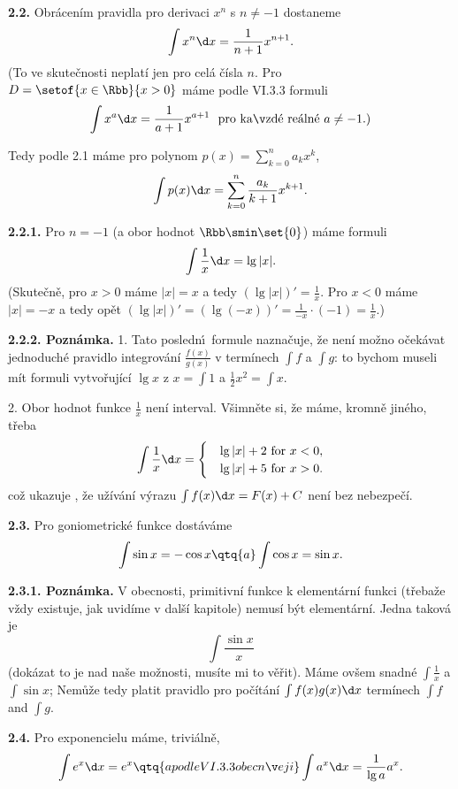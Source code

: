 \documentclass[12pt]{article}
\begin{document}
{  \bigskip
  
  {\bf 2.2.} Obrácením pravidla pro derivaci $x^n$ s $n\neq-1$ dostaneme
  $$
  \int x^n\d x=\frac{1}{n+1}x^{n+1}.
  $$
  (To ve skutečnosti neplatí jen pro celá čísla $n$. Pro $D=\setof{x\in\Rbb}{x>0}$ máme podle VI.3.3 formuli
  $$
  \int x^a\d x=\frac{1}{a+1}x^{a+1} \ \ \text{pro každé reálné $a\neq -1$}. )
  $$
  
  \smallskip
  Tedy podle 2.1 máme pro polynom $p(x)=\sum_{k=0}^na_kx^k$,
  $$
  \int p(x)\d x= \sum_{k=0}^n\frac{a_k}{k+1}x^{k+1}.
  $$
  
  \medskip
  
  {\bf 2.2.1.} Pro $n=-1$ (a obor hodnot $\Rbb\smin\set{0}$) máme formuli
  $$
  \int\frac{1}{x}\d x= \lg |x|.
  $$
 (Skutečně, pro $x>0$ máme $|x|=x$ a tedy $(\lg |x|)'=\frac{1}{x}$. 
  Pro $x<0$ máme $|x|=-x$ a tedy opět $(\lg |x|)'=(\lg(-x))'=\frac{1}{-x}\cdot(-1)=\frac{1}{x}$.)
  
  \medskip
  
  {\bf 2.2.2. Poznámka.} 1. Tato posledn\'\i\ formule naznačuje, že není možno očekávat jednoduché pravidlo integrování   $\frac{f(x)}{g(x)}$ v termínech $\int f$ a $\int g$: to bychom museli mít formuli vytvořující $\lg x$ z
  $x=\int 1$ a $\frac12 x^2=\int x$.
  
  2. Obor hodnot funkce $\frac{1}{x}$ není interval. Všimněte si, že máme, kromně jiného, třeba
  $$
  \int\frac{1}{x}\d x=\begin{cases}&\lg |x|+2\ \text{for}\ x<0,\\
  &\lg |x|+5\ \text{for}\ x>0.
  \end{cases}
  $$
  což ukazuje , že užívání výrazu $\int f(x)\d x=F(x)+C$ není bez nebezpečí.
  
  \bigskip
  
  {\bf 2.3.} Pro goniometrické funkce dostáváme
  $$
  \int\sin x=-\cos x\qtq{a} \int\cos x=\sin x.
  $$
  
  \medskip
  
  {\bf 2.3.1. Poznámka.} V obecnosti, primitivní funkce k elementární funkci (třebaže vždy existuje, jak uvidíme v další kapitole) nemusí být elementární. Jedna taková je
  $$
  \int \frac{\sin x}{x}
  $$
  (dokázat to je nad naše možnosti, musíte mi to věřit). Máme ovšem snadné
  $\int\frac{1}{x}$ a $\int\sin x$; Nemůže tedy platit pravidlo pro počítání
   $\int f(x)g(x)\d x$ termínech $\int f$ and $\int g$.
  
  \bigskip
  
  {\bf 2.4.} Pro exponencielu máme, triviálně,
  $$
  \int e^x\d x=e^x \qtq{a podle VI.3.3 obecněji} \int a^x\d x= \frac{1}{\lg a}a^x.
  $$
  
}
\end{document}
